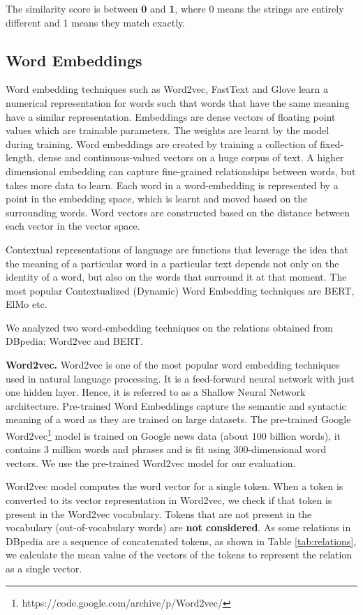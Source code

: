 The similarity score is between \textbf{0} and \textbf{1}, where 0 means the strings are entirely different and
1 means they match exactly.

\subsection{Word Embeddings}
\label{sec:wordembeddings}
Word embedding techniques such as Word2vec\cite{word2vec}, FastText\cite{fasttext} and Glove\cite{glove} learn a numerical representation for words such that words that have the same meaning have a similar representation. Embeddings are dense vectors of floating point values which are trainable parameters. The weights are learnt by the model during training. Word embeddings are created by training a collection of fixed-length, dense and continuous-valued vectors on a huge corpus of text. A higher dimensional embedding can capture fine-grained relationships between words, but takes more data to learn. Each word in a word-embedding is represented by a point in the embedding space, which is learnt and moved based on the surrounding words. Word vectors are constructed based on the distance between each vector in the vector space. 

Contextual representations of language are functions that leverage the idea that the meaning of a particular word in a particular text depends not only on the identity of a word, but also on the words that surround it at that moment. The most popular Contextualized (Dynamic) Word Embedding techniques are BERT\cite{bert}, ElMo\cite{elmo} etc.

We analyzed two word-embedding techniques on the relations obtained from DBpedia: Word2vec and BERT.

\textbf{Word2vec.} Word2vec is one of the most popular word embedding techniques used in natural language processing. It is a feed-forward neural network with just one hidden layer. Hence, it is referred to as a Shallow Neural Network architecture. Pre-trained Word Embeddings capture the semantic and syntactic meaning of a word as they are trained on large datasets. The pre-trained Google Word2vec\footnote{https://code.google.com/archive/p/Word2vec/} model is trained on Google news data (about 100 billion words), it contains 3 million words and phrases and is fit using 300-dimensional word vectors. We use the pre-trained Word2vec model for our evaluation.

Word2vec model computes the word vector for a single token. When a token is converted to its vector representation in Word2vec, we check if that token is present in the Word2vec vocabulary. Tokens that are not present in the vocabulary (out-of-vocabulary words) are \textbf{not considered}. As some relations in DBpedia are a sequence of concatenated tokens, as shown in Table \ref{tab:relations}, we calculate the mean value of the vectors of the tokens to represent the relation as a single vector.

